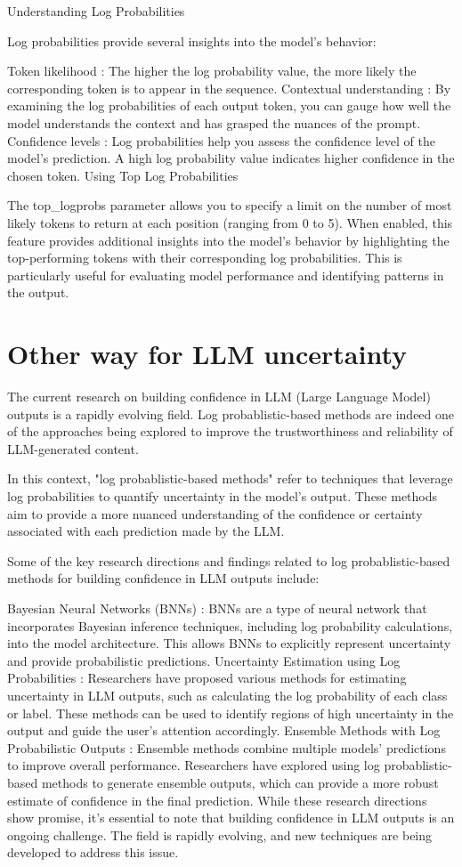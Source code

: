 Understanding Log Probabilities

Log probabilities provide several insights into the model's behavior:

Token likelihood : The higher the log probability value, the more likely the corresponding
token is to appear in the sequence. Contextual understanding : By examining the
log probabilities of each output token, you can gauge how well the model understands
the context and has grasped the nuances of the prompt. Confidence levels : Log
probabilities help you assess the confidence level of the model's prediction. A high
log probability value indicates higher confidence in the chosen token. Using Top
Log Probabilities

The top\_logprobs parameter allows you to specify a limit on the number of most likely
tokens to return at each position (ranging from 0 to 5). When enabled, this feature
provides additional insights into the model's behavior by highlighting the top-performing
tokens with their corresponding log probabilities. This is particularly useful
for evaluating model performance and identifying patterns in the output.

\section{Other way for LLM uncertainty}
The current research on building confidence in LLM (Large Language Model)
outputs is a rapidly evolving field. Log probablistic-based methods are indeed one
of the approaches being explored to improve the trustworthiness and reliability of
LLM-generated content.

In this context, "log probablistic-based methods" refer to techniques that
leverage log probabilities to quantify uncertainty in the model's output. These methods
aim to provide a more nuanced understanding of the confidence or certainty associated
with each prediction made by the LLM.

Some of the key research directions and findings related to log probablistic-based
methods for building confidence in LLM outputs include:

Bayesian Neural Networks (BNNs) : BNNs are a type of neural network that incorporates
Bayesian inference techniques, including log probability calculations, into the model
architecture. This allows BNNs to explicitly represent uncertainty and provide
probabilistic predictions. Uncertainty Estimation using Log Probabilities : Researchers
have proposed various methods for estimating uncertainty in LLM outputs, such as
calculating the log probability of each class or label. These methods can be used
to identify regions of high uncertainty in the output and guide the user's attention
accordingly. Ensemble Methods with Log Probabilistic Outputs : Ensemble methods
combine multiple models' predictions to improve overall performance. Researchers
have explored using log probablistic-based methods to generate ensemble outputs,
which can provide a more robust estimate of confidence in the final prediction.
While these research directions show promise, it's essential to note that building
confidence in LLM outputs is an ongoing challenge. The field is rapidly evolving,
and new techniques are being developed to address this issue.

